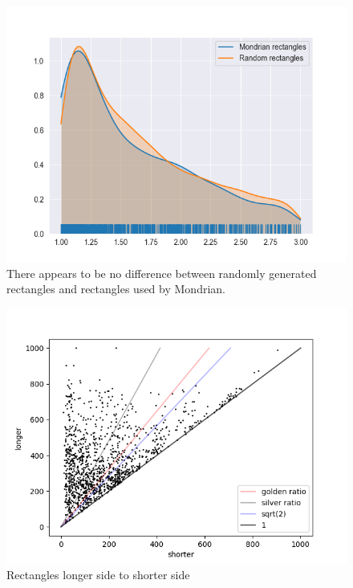 \documentclass[serif,article,noparskip]{agse-thesis}
\begin{document}
\begin{figure}
\includegraphics[width=\linewidth]{images/aspect-max-min-rects.png}
\caption{There appears to be no difference between randomly generated rectangles and rectangles used by Mondrian.}
\label{fig:aspect-rects}
\end{figure}

\begin{figure}
\includegraphics[width=\linewidth]{images/longer-x-shorter.png}
\caption{Rectangles longer side to shorter side}
\label{fig:longer-x-shorter}
\end{figure}


\end{document}
